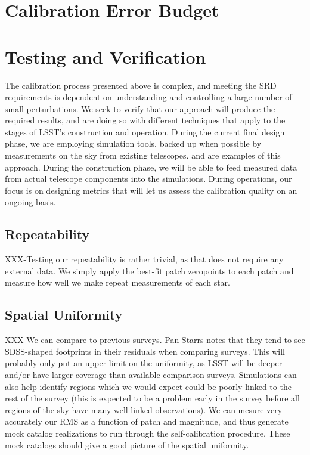 \documentclass[12pt,preprint]{aastex}
\begin{document}
\section{Calibration Error Budget}

\section{Testing and Verification}
\label{sec:verification}

The calibration process presented above is complex, and meeting the SRD requirements
is dependent on understanding and controlling a large number of small perturbations.  We seek to verify that our approach will produce the required results, and are doing so with different techniques that apply to the stages of LSST's construction and operation.   During the current final design phase, we are employing simulation tools, backed up when possible by measurements on the sky from existing telescopes.   \citep{Burke2013} and \citep{Burke2010b} are examples of this approach.  During the construction phase, we will be able to feed measured data from actual telescope components into the simulations.   During operations, our focus is on designing metrics that will let us assess the calibration quality on an ongoing basis.

\subsection{Repeatability}

XXX-Testing our repeatability is rather trivial, as that does not require
any external data.  We simply apply the best-fit patch zeropoints to
each patch and measure how well we make repeat measurements of each
star.

\subsection{Spatial Uniformity}

XXX-We can compare to previous surveys.  Pan-Starrs notes that they
tend to see SDSS-shaped footprints in their residuals when comparing
surveys.  This will probably only put an upper limit on the
uniformity, as LSST will be deeper and/or have larger coverage than
available comparison surveys.  Simulations can also help identify
regions which we would expect could be poorly linked to the rest of
the survey (this is expected to be a problem early in the survey
before all regions of the sky have many well-linked observations).  We
can mesure very accurately our RMS as a function of patch and
magnitude, and thus generate mock catalog realizations to run through
the self-calibration procedure.  These mock catalogs should give a
good picture of the spatial uniformity.
\end{document}
